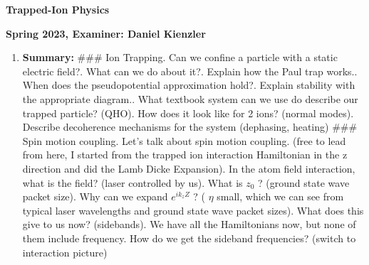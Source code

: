 \documentclass{article}%
\begin{document}
%
\normalsize%
\begin{center}%
\begin{Large}%
\textbf{Trapped{-}Ion Physics}%
\end{Large}%
\linebreak%
\end{center}%
\begin{center}%
\begin{large}%
\textbf{Spring 2023, Examiner: Daniel Kienzler}%
\end{large}%
\end{center}%
\begin{enumerate}%
\item%
\begin{mycolorbox}%
\textbf{Summary:}%
\newline%
\#\#\# Ion Trapping. Can we confine a particle with a static electric field?. What can we do about it?. Explain how the Paul trap works.. When does the pseudopotential approximation hold?. Explain stability with the appropriate diagram.. What textbook system can we use do describe our trapped particle? (QHO). How does it look like for 2 ions? (normal modes). Describe decoherence mechanisms for the system (dephasing, heating)\newline%
\newline%
\#\#\# Spin motion coupling. Let's talk about spin motion coupling. (free to lead from here, I started from the trapped ion interaction Hamiltonian in the z direction and did the Lamb Dicke Expansion). In the atom field interaction, what is the field? (laser controlled by us). What is %
$z_{0}$%
? (ground state wave packet size). Why can we expand %
$e^{ik_{z}Z}$%
? (%
$\eta$ %
 small, which we can see from typical laser wavelengths and ground state wave packet sizes). What does this give to us now? (sidebands). We have all the Hamiltonians now, but none of them include frequency. How do we get the sideband frequencies? (switch to interaction picture)\newline%

\end{mycolorbox}
\end{enumerate}
\end{document}
